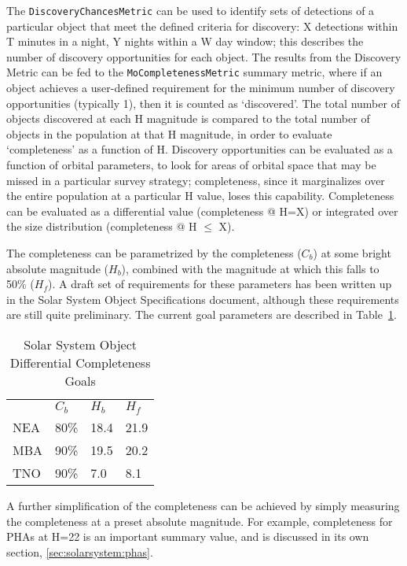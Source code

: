 The {\tt DiscoveryChancesMetric} can be used to identify sets of
detections of a particular object that meet the defined criteria for
discovery: X detections within T minutes in a night, Y nights within a
W day window; this describes the number of discovery opportunities for
each object. The results from the Discovery Metric can be fed to the
{\tt MoCompletenessMetric} summary metric, where if an object achieves
a user-defined requirement for the minimum number of discovery
opportunities (typically 1), then it is counted as `discovered'.  The
total number of objects discovered at each H magnitude is compared to
the total number of objects in the population at that H magnitude, in
order to evaluate `completeness' as a function of H. Discovery
opportunities can be evaluated as a function of orbital parameters, to
look for areas of orbital space that may be missed in a particular
survey strategy; completeness, since it marginalizes over the entire
population at a particular H value, loses this
capability. Completeness can be evaluated as a differential value
(completeness @ H=X) or integrated over the size distribution
(completeness @ H $\leq$ X).

The completeness can be parametrized by the completeness ($C_b$) at
some bright absolute magnitude ($H_b$), combined with the magnitude at
which this falls to 50\% ($H_f$). A draft set of requirements for
these parameters has been written up in the Solar System Object
Specifications document, although these requirements are still quite
preliminary. The current goal parameters are described in Table~\ref{ssoreqs}.

\begin{table}[]
\centering
\caption{Solar System Object Differential Completeness Goals}
\label{ssoreqs}
\begin{tabular}{llll}
    & $C_b$ & $H_b$ & $H_f$ \\
NEA & 80\%  & 18.4  & 21.9  \\
MBA & 90\%  & 19.5  & 20.2  \\
TNO & 90\%  & 7.0   & 8.1
\end{tabular}
\end{table}

A further simplification of the completeness can be achieved by simply
measuring the completeness at a preset absolute magnitude. For
example, completeness for PHAs at H=22 is an important summary value,
and is discussed in its own section, \ref{sec:solarsystem:phas}.



